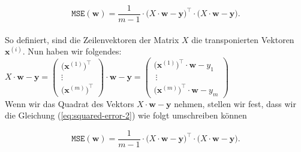 \documentclass[12pt]{article}
\begin{document}
\begin{equation}
  \label{eq:squared-error-3}
  \mathtt{MSE}(\mathbf{w}) = \frac{1}{m-1} \cdot \bigl(X \cdot \mathbf{w} - \textbf{y}\bigr)^\top \cdot \bigl(X \cdot \mathbf{w} - \textbf{y}\bigr).
\end{equation}\\

So definiert, sind die Zeilenvektoren der Matrix $X$ die transponierten Vektoren $\mathbf{x}^{(i)}$.
Nun haben wir folgendes:
\\[0.2cm]
\hspace*{1.3cm}
$X \cdot \mathbf{w} - \mathbf{y} = \left(
  \begin{array}{c}
    \bigl(\mathbf{x}^{(1)}\bigr)^\top \\
    \vdots \\
    \bigl(\mathbf{x}^{(m)}\bigr)^\top
  \end{array}
  \right) \cdot \mathbf{w} - \mathbf{y} = \left(
  \begin{array}{c}
    \bigl(\mathbf{x}^{(1)}\bigr)^\top \cdot \mathbf{w} - y_1 \\\
    \vdots \\
    \bigl(\mathbf{x}^{(m)}\bigr)^\top \cdot \mathbf{w} - y_m
  \end{array}
  \right)
$
\\[0.2cm]
Wenn wir das Quadrat des Vektors $X \cdot \mathbf{w} - \mathbf{y}$ nehmen, stellen wir fest, dass wir die Gleichung (\ref{eq:squared-error-2}) wie folgt umschreiben können

\begin{equation}
  \label{eq:squared-error-3}
  \mathtt{MSE}(\mathbf{w}) = \frac{1}{m-1} \cdot \bigl(X \cdot \mathbf{w} - \textbf{y}\bigr)^\top \cdot \bigl(X \cdot \mathbf{w} - \textbf{y}\bigr).
\end{equation}\\
\end{document}

